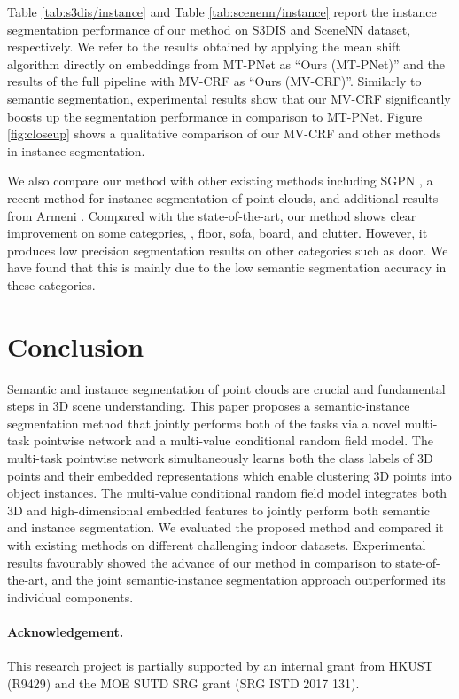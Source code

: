\documentclass[10pt,twocolumn,letterpaper]{article}
\begin{document}
Table \ref{tab:s3dis/instance} and Table \ref{tab:scenenn/instance} report the
instance segmentation performance of our method on S3DIS and SceneNN dataset,
respectively. We refer to the results obtained by applying the mean shift
algorithm directly on embeddings from MT-PNet as ``Ours (MT-PNet)'' and the
results of the full pipeline with MV-CRF as ``Ours (MV-CRF)''. Similarly to
semantic segmentation, experimental results show that our MV-CRF significantly
boosts up the segmentation performance in comparison to MT-PNet. Figure
\ref{fig:closeup} shows a qualitative comparison of our MV-CRF and other methods
in instance segmentation.

We also compare our method with other existing methods including SGPN
\cite{wang-sgpn-cvpr18}, a recent method for instance segmentation of point
clouds, and additional results from Armeni \etal \cite{armeni-s3dis-cvpr16}.
Compared with the state-of-the-art, our method shows clear improvement on some
categories, \eg, floor, sofa, board, and clutter. However, it produces low
precision segmentation results on other categories such as door. We have found
that this is mainly due to the low semantic segmentation accuracy in these
categories.
 \section{Conclusion}
\label{sec:remark}

Semantic and instance segmentation of point clouds are crucial and fundamental
steps in 3D scene understanding. This paper proposes a semantic-instance
segmentation method that jointly performs both of the tasks via a novel
multi-task pointwise network and a multi-value conditional random field
model. The multi-task pointwise network simultaneously learns both the class
labels of 3D points and their embedded representations which enable clustering
3D points into object instances. The multi-value conditional random field model
integrates both 3D and high-dimensional embedded features to jointly perform
both semantic and instance segmentation. We evaluated the proposed method and
compared it with existing methods on different challenging indoor
datasets. Experimental results favourably showed the advance of our method in
comparison to state-of-the-art, and the joint semantic-instance segmentation
approach outperformed its individual components.

\paragraph{Acknowledgement.} This research project is partially supported by an
internal grant from HKUST (R9429) and the MOE SUTD SRG grant (SRG ISTD 2017
131).
 
{\small
  
  
}
\end{document}
